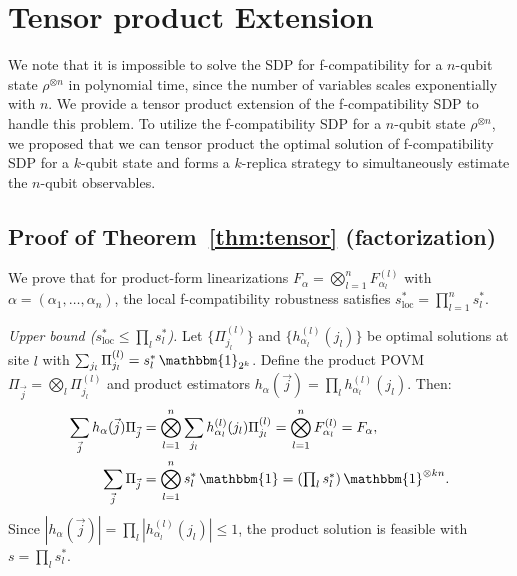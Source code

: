 \documentclass[aps,%
twocolumn,%
floatfix,%
pra,%
amsfonts,%
groupedaddress,%
superscriptaddress]{revtex4-2}%
\newcommand{\ox}{\otimes}
\newcommand{\1}{\mathbbm{1}}
\begin{document}
\section{Tensor product Extension}\label{app:tensor}
We note that it is impossible to solve the SDP for f-compatibility for a $n$-qubit state $\rho^{\otimes n}$ in polynomial time, since the number of variables scales exponentially with $n$.   
We provide a tensor product extension of the f-compatibility SDP to handle this problem.
To utilize the f-compatibility SDP for a $n$-qubit state $\rho^{\otimes n}$, we proposed that we can tensor product the optimal solution of f-compatibility SDP for a $k$-qubit state and forms a $k$-replica strategy to simultaneously estimate the $n$-qubit observables.

\subsection{Proof of Theorem~\ref{thm:tensor} (factorization)}

We prove that for product-form linearizations $F_\alpha = \bigotimes_{l=1}^n F_{\alpha_l}^{(l)}$ with $\alpha = (\alpha_1,\ldots,\alpha_n)$, the local f-compatibility robustness satisfies $s^*_{\mathrm{loc}} = \prod_{l=1}^n s^*_l$.

\emph{Upper bound ($s^*_{\mathrm{loc}} \leq \prod_l s^*_l$).}
Let $\{\Pi_{j_l}^{(l)}\}$ and $\{h_{\alpha_l}^{(l)}(j_l)\}$ be optimal solutions at site $l$ with $\sum_{j_l}\Pi_{j_l}^{(l)} = s^*_l\,\1_{2^k}$. Define the product POVM $\Pi_{\vec{j}} = \bigotimes_l \Pi_{j_l}^{(l)}$ and product estimators $h_\alpha(\vec{j}) = \prod_l h_{\alpha_l}^{(l)}(j_l)$. Then:
\begin{align}
\sum_{\vec{j}} h_\alpha(\vec{j})\Pi_{\vec{j}} &= \bigotimes_{l=1}^n \sum_{j_l} h_{\alpha_l}^{(l)}(j_l)\Pi_{j_l}^{(l)} = \bigotimes_{l=1}^n F_{\alpha_l}^{(l)} = F_\alpha,\\
\sum_{\vec{j}} \Pi_{\vec{j}} &= \bigotimes_{l=1}^n s^*_l\,\1 = \textstyle\left(\prod_l s^*_l\right)\1^{\ox kn}.
\end{align}
Since $|h_\alpha(\vec{j})| = \prod_l |h_{\alpha_l}^{(l)}(j_l)| \leq 1$, the product solution is feasible with $s = \prod_l s^*_l$.
\end{document}
